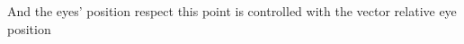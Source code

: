 \documentclass[preview]{standalone}
\begin{document}
\begin{center}
And the eyes' position respect this point is controlled with the vector relative eye position
\end{center}
\end{document}
